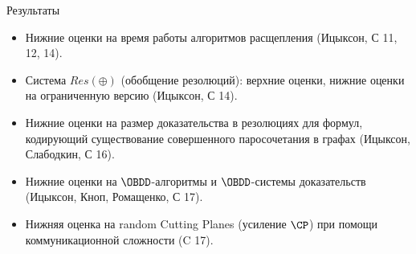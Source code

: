 \begin{frame}{Результаты}

    \begin{itemize}
        \item Нижние оценки на время работы алгоритмов расщепления (Ицыксон, С 11, 12, 14).
        \pause
        \item Система $Res(\oplus)$ (обобщение резолюций): верхние оценки, нижние оценки на ограниченную версию (Ицыксон,
            С 14).
        \pause
        \item Нижние оценки на размер доказательства в резолюциях для формул, кодирующий существование совершенного
            паросочетания в графах (Ицыксон, Слабодкин, С 16).
        \pause
        \item Нижние оценки на $\OBDD$-алгоритмы и $\OBDD$-системы доказательств (Ицыксон, Кноп, Ромащенко, С 17).
        \pause
        \item Нижняя оценка на {\color{blue} random} Cutting Planes (усиление $\CP$) при помощи коммуникационной сложности (C
            17).
    \end{itemize}

\end{frame}


